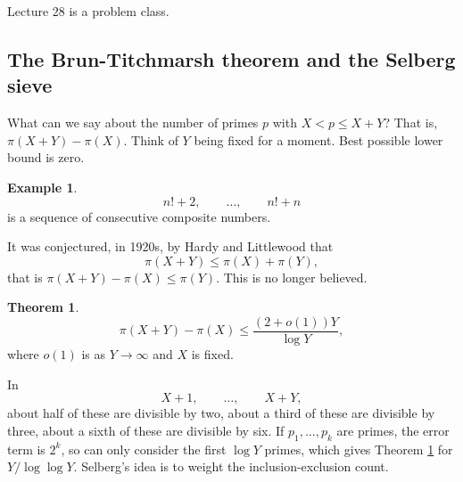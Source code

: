 \documentclass{article}
\newcommand{\rb}[1]{\left( #1 \right)}
\theoremstyle{definition}\newtheorem{definition}{Definition}
\theoremstyle{definition}\newtheorem{remark}[definition]{Remark}
\theoremstyle{definition}\newtheorem*{example}{Example}
\theoremstyle{definition}\newtheorem*{note}{Note}
\newtheorem{theorem}[definition]{Theorem}
\begin{document}

Lecture 28 is a problem class.


\subsection{The Brun-Titchmarsh theorem and the Selberg sieve}

What can we say about the number of primes $ p $ with $ X < p \le X + Y $? That is, $ \pi\rb{X + Y} - \pi\rb{X} $. Think of $ Y $ being fixed for a moment. Best possible lower bound is zero.

\begin{example}
$$ n! + 2, \qquad \dots, \qquad n! + n $$
is a sequence of consecutive composite numbers.
\end{example}

It was conjectured, in 1920s, by Hardy and Littlewood that
$$ \pi\rb{X + Y} \le \pi\rb{X} + \pi\rb{Y}, $$
that is $ \pi\rb{X + Y} - \pi\rb{X} \le \pi\rb{Y} $. This is no longer believed.

\begin{theorem}
\label{thm:107}
$$ \pi\rb{X + Y} - \pi\rb{X} \le \dfrac{\rb{2 + o\rb{1}}Y}{\log Y}, $$
where $ o\rb{1} $ is as $ Y \to \infty $ and $ X $ is fixed.
\end{theorem}

In
$$ X + 1, \qquad \dots, \qquad X + Y, $$
about half of these are divisible by two, about a third of these are divisible by three, about a sixth of these are divisible by six. If $ p_1, \dots, p_k $ are primes, the error term is $ 2^k $, so can only consider the first $ \log Y $ primes, which gives Theorem \ref{thm:107} for $ Y / \log \log Y $. Selberg's idea is to weight the inclusion-exclusion count.
\end{document}
